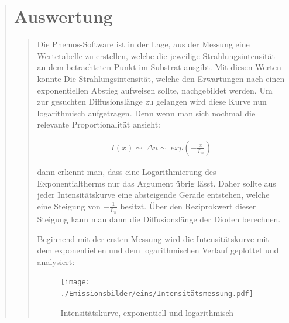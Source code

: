 \begin{quote}
        
        \section{Auswertung}
        \begin{quote}
        
        Die Phemos-Software ist in der Lage, aus der Messung eine Wertetabelle
        zu erstellen, welche die jeweilige Strahlungsintensität an dem
        betrachteten Punkt im Substrat ausgibt. Mit diesen Werten konnte Die
        Strahlungsintensität, welche den Erwartungen nach einen exponentiellen
        Abstieg aufweisen sollte, nachgebildet werden. Um zur gesuchten
        Diffusionslänge zu gelangen wird diese Kurve nun logarithmisch
        aufgetragen. Denn wenn man sich nochmal die relevante Proportionalität
        ansieht:
        
        \begin{equation*}
        \begin{split}
            I(x) \sim \ \Delta n \sim \ exp(-\frac{x}{L_n}) 
        \end{split}
        \end{equation*}
        
        dann erkennt man, dass eine Logarithmierung des Exponentialtherms nur
        das Argument übrig lässt. Daher sollte aus jeder Intensitätskurve
        eine absteigende Gerade entstehen, welche eine Steigung von $-\frac{1}{L_n}$
        besitzt. Über den Reziprokwert dieser Steigung kann man dann die
        Diffusionslänge der Dioden berechnen.
        
        \vspace{1em}
        
        Beginnend mit der ersten Messung wird die Intensitätskurve mit dem
        exponentiellen und dem logarithmischen Verlauf geplottet und analysiert:
        
        \begin{figure}[H]
                    \centering
                        \texttt{[image: ./Emissionsbilder/eins/Intensitätsmessung.pdf]}
                        \caption{Intensitätskurve, exponentiell und
                        logarithmisch}
                            \label{fig:./Emissionsbilder/eins/Intensitätsmessung.pdf}
            \end{figure}
            
        
        \end{quote}
    
\end{quote} %





